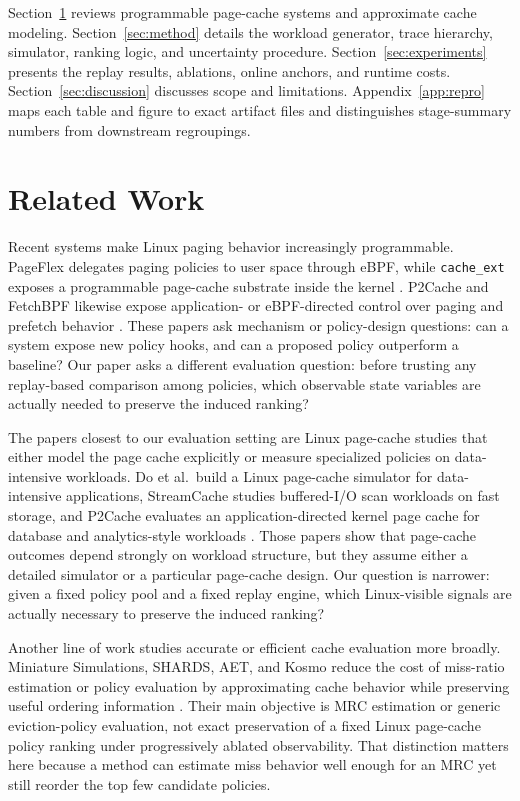\documentclass{article}
\begin{document}
Section~\ref{sec:related} reviews programmable page-cache systems and approximate cache modeling. Section~\ref{sec:method} details the workload generator, trace hierarchy, simulator, ranking logic, and uncertainty procedure. Section~\ref{sec:experiments} presents the replay results, ablations, online anchors, and runtime costs. Section~\ref{sec:discussion} discusses scope and limitations. Appendix~\ref{app:repro} maps each table and figure to exact artifact files and distinguishes stage-summary numbers from downstream regroupings.

\section{Related Work}
\label{sec:related}
Recent systems make Linux paging behavior increasingly programmable. PageFlex delegates paging policies to user space through eBPF, while \texttt{cache\_ext} exposes a programmable page-cache substrate inside the kernel \citep{yelam2025pageflex,cacheext}. P2Cache and FetchBPF likewise expose application- or eBPF-directed control over paging and prefetch behavior \citep{lee2023p2cache,cao2024fetchbpf}. These papers ask mechanism or policy-design questions: can a system expose new policy hooks, and can a proposed policy outperform a baseline? Our paper asks a different evaluation question: before trusting any replay-based comparison among policies, which observable state variables are actually needed to preserve the induced ranking?

The papers closest to our evaluation setting are Linux page-cache studies that either model the page cache explicitly or measure specialized policies on data-intensive workloads. Do et al.\ build a Linux page-cache simulator for data-intensive applications, StreamCache studies buffered-I/O scan workloads on fast storage, and P2Cache evaluates an application-directed kernel page cache for database and analytics-style workloads \citep{do2021linuxpagecache,li2024streamcache,lee2023p2cache}. Those papers show that page-cache outcomes depend strongly on workload structure, but they assume either a detailed simulator or a particular page-cache design. Our question is narrower: given a fixed policy pool and a fixed replay engine, which Linux-visible signals are actually necessary to preserve the induced ranking?

Another line of work studies accurate or efficient cache evaluation more broadly. Miniature Simulations, SHARDS, AET, and Kosmo reduce the cost of miss-ratio estimation or policy evaluation by approximating cache behavior while preserving useful ordering information \citep{waldspurger2017miniature,waldspurger2015shards,hu2016aet,shakiba2024kosmo}. Their main objective is MRC estimation or generic eviction-policy evaluation, not exact preservation of a fixed Linux page-cache policy ranking under progressively ablated observability. That distinction matters here because a method can estimate miss behavior well enough for an MRC yet still reorder the top few candidate policies.
\end{document}
